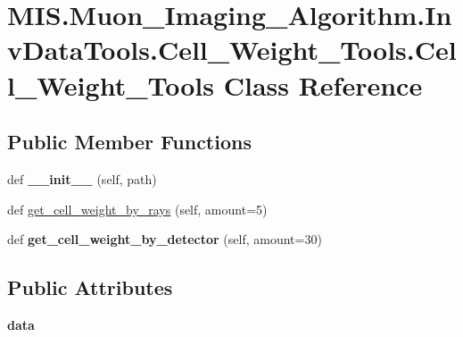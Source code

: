 \hypertarget{classMIS_1_1Muon__Imaging__Algorithm_1_1InvDataTools_1_1Cell__Weight__Tools_1_1Cell__Weight__Tools}{}\section{M\+I\+S.\+Muon\+\_\+\+Imaging\+\_\+\+Algorithm.\+Inv\+Data\+Tools.\+Cell\+\_\+\+Weight\+\_\+\+Tools.\+Cell\+\_\+\+Weight\+\_\+\+Tools Class Reference}
\label{classMIS_1_1Muon__Imaging__Algorithm_1_1InvDataTools_1_1Cell__Weight__Tools_1_1Cell__Weight__Tools}
\subsection*{Public Member Functions}
\begin{DoxyCompactItemize}
\item 
\mbox{\label{classMIS_1_1Muon__Imaging__Algorithm_1_1InvDataTools_1_1Cell__Weight__Tools_1_1Cell__Weight__Tools_a4713c7f0524c4936d3f7f2b899e21141}} 
def {\bfseries \+\_\+\+\_\+init\+\_\+\+\_\+} (self, path)
\item 
def \hyperlink{classMIS_1_1Muon__Imaging__Algorithm_1_1InvDataTools_1_1Cell__Weight__Tools_1_1Cell__Weight__Tools_a176d8a2eb1121e564b8d65607a925b84}{get\+\_\+cell\+\_\+weight\+\_\+by\+\_\+rays} (self, amount=5)
\item 
\mbox{\label{classMIS_1_1Muon__Imaging__Algorithm_1_1InvDataTools_1_1Cell__Weight__Tools_1_1Cell__Weight__Tools_ab8ac9bdb3220020087e0cd4c97b8fcbc}} 
def {\bfseries get\+\_\+cell\+\_\+weight\+\_\+by\+\_\+detector} (self, amount=30)
\end{DoxyCompactItemize}
\subsection*{Public Attributes}
\begin{DoxyCompactItemize}
\item 
\mbox{\label{classMIS_1_1Muon__Imaging__Algorithm_1_1InvDataTools_1_1Cell__Weight__Tools_1_1Cell__Weight__Tools_a6522561b6e427e1fb160488e708597c1}} 
{\bfseries data}
\end{DoxyCompactItemize}


